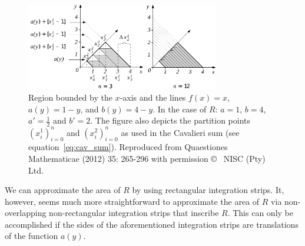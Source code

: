 \documentclass[twoside,reqno,11pt]{fcaa-var} %
\begin{document}
\begin{figure}[htb]
\centering
\includegraphics[width=0.75\textwidth]{fig13.pdf}
\caption{Region bounded by the $x$-axis and the lines $f(x)=x$, $a(y)=1-y$, and $b(y)=4-y$. In the case of $R$: $a=1$, $b=4$, $a'=\frac{1}{2}$ and $b'=2$. The figure also depicts the partition points $(x_i^1)_{i=0}^{n}$ and $(x_i^2)_{i=0}^{n}$ as used in the Cavalieri sum (see equation~\eqref{eq:cav_sum}). Reproduced from Quaestiones Mathematicae (2012) 35: 265-296 with permission \copyright~ NISC (Pty) Ltd.}
\label{fig:caval2}
\end{figure}


\noindent
We can approximate the area of $R$ by using rectangular integration strips. It, however, seems much more straightforward to approximate the area of $R$ via non-overlapping non-rectangular integration strips that inscribe $R$. This can only be accomplished if the sides of the aforementioned integration strips are translations of the function $a(y)$.\\
\end{document}
